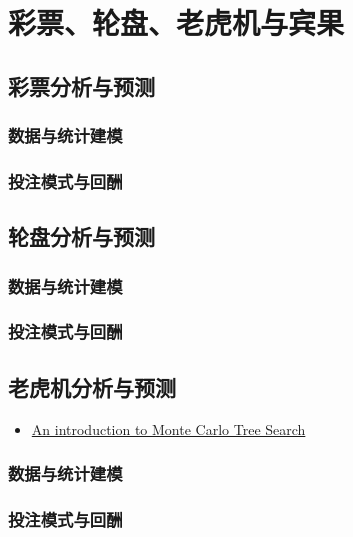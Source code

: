 \documentclass[]{book}
\providecommand{\tightlist}{%
  \setlength{\itemsep}{0pt}\setlength{\parskip}{0pt}}
\theoremstyle{definition}
\theoremstyle{definition}
\theoremstyle{definition}
\theoremstyle{remark}
\begin{document}
\chapter{彩票、轮盘、老虎机与宾果}\label{lottery}

\section{彩票分析与预测}

\subsection{数据与统计建模}

\subsection{投注模式与回酬}

\section{轮盘分析与预测}

\subsection{数据与统计建模}\label{-1}

\subsection{投注模式与回酬}\label{-1}

\section{老虎机分析与预测}

\begin{itemize}
\tightlist
\item
  \href{https://appsilon.com/an-introduction-to-monte-carlo-tree-search/}{An
  introduction to Monte Carlo Tree Search}
\end{itemize}

\subsection{数据与统计建模}\label{-2}

\subsection{投注模式与回酬}\label{-2}
\end{document}

